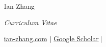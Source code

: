 \begin{center}
{\huge Ian Zhang\par}
\vspace{4pt}
{\small\itshape Curriculum Vitae\par}

\vspace{8pt}
{\small
\href{https://ian-zhang.com/}{ian-zhang.com}
\quad$\vert$\quad
\href{https://scholar.google.ca/citations?user=0FL5fjMAAAAJ&hl=en}
     {Google Scholar}
\quad$\vert$\quad
\href{mailto:\email}{\email}
\par}
\end{center}